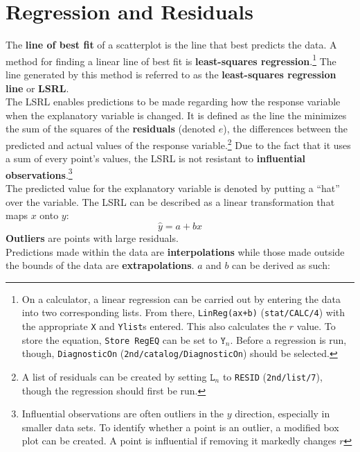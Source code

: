 \documentclass[../AP_Statistics.tex]{subfiles}
\begin{document}
		\section{Regression and Residuals}
			The \textbf{line of best fit} of a scatterplot is the line that best predicts the data. A method for finding a linear line of best fit is \textbf{least-squares regression}.\footnote{On a calculator, a linear regression can be carried out by entering the data into two corresponding lists. From there, \texttt{LinReg(ax+b)} (\texttt{stat/CALC/4}) with the appropriate \texttt{X} and \texttt{Ylist}s entered. This also calculates the $r$ value. To store the equation, \texttt{Store RegEQ} can be set to $\texttt{Y}_n$. Before a regression is run, though, \texttt{DiagnosticOn} (\texttt{2nd/catalog/DiagnosticOn}) should be selected.} The line generated by this method is referred to as the \textbf{least-squares regression line} or \textbf{LSRL}. \\
			The LSRL enables predictions to be made regarding how the response variable when the explanatory variable is changed. It is defined as the line the minimizes the sum of the squares of the \textbf{residuals} (denoted $e$), the differences between the predicted and actual values of the response variable.\footnote{A list of residuals can be created by setting $\texttt{L}_n$ to \texttt{RESID} (\texttt{2nd/list/7}), though the regression should first be run.} Due to the fact that it uses a sum of every point's values, the LSRL is not resistant to \textbf{influential observations}.\footnote{Influential observations are often outliers in the $y$ direction, especially in smaller data sets. To identify whether a point is an outlier, a modified box plot can be created. A point is influential if removing it markedly changes $r$} \\
			The predicted value for the explanatory variable is denoted by putting a \enquote{hat} over the variable.
			The LSRL can be described as a linear transformation that maps $x$ onto $y$:		
			$$\hat{y} = a + bx$$
			\textbf{Outliers} are points with large residuals.\\
			Predictions made within the data are \textbf{interpolations} while those made outside the bounds of the data are \textbf{extrapolations}.
			$a$ and $b$ can be derived as such:
\end{document}
